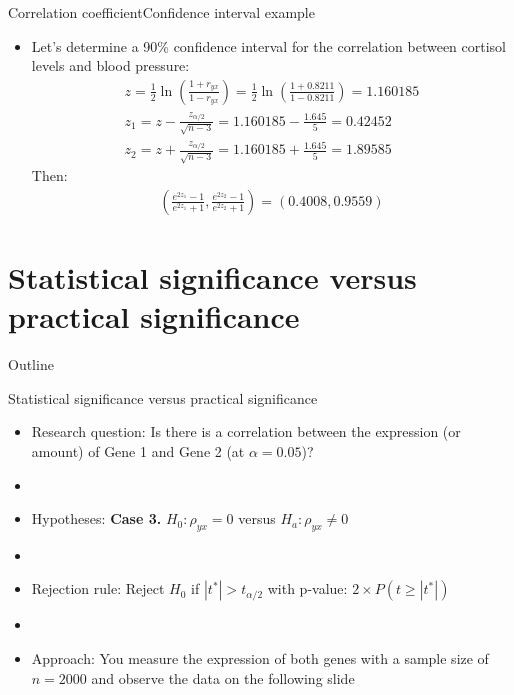 \documentclass[xcolor=dvipsnames]{beamer}
\begin{document}
\begin{frame}{Correlation coefficient}{Confidence interval example}
	\begin{itemize}
		\item Let's determine a 90\% confidence interval for the correlation between cortisol levels and blood pressure:
		\begin{gather*}
		z = \frac{1}{2} \ln \left( \frac{1+r_{yx}}{1-r_{yx}} \right) =  \frac{1}{2} \ln \left( \frac{1+0.8211}{1-0.8211} \right) = 1.160185\\
		z_1 = z - \frac{z_{\alpha / 2}}{\sqrt{n-3}} = 1.160185 - \frac{1.645}{5} = 0.42452 \\
		z_2 = z + \frac{z_{\alpha / 2}}{\sqrt{n-3}} = 1.160185 + \frac{1.645}{5} = 1.89585
		\end{gather*}
		Then: 
		\begin{gather*}
		\left(\frac{e^{2 z_1}-1}{e^{2 z_1}+1}, \frac{e^{2 z_2}-1}{e^{2 z_2}+1} \right) = (0.4008, 0.9559)
		\end{gather*}

	\end{itemize}
\end{frame}

\section{Statistical significance versus practical significance}
\begin{frame}{Outline}
	\tableofcontents[currentsection,subsectionstyle=show/shaded/hide]
\end{frame}

\begin{frame}{Statistical significance versus practical significance}
	\begin{itemize}
		\item Research question: Is there is a correlation between the expression (or amount) of Gene 1 and Gene 2 (at $\alpha = 0.05$)?
		\item[]
		\item Hypotheses: \textbf{Case 3.} $H_0: \rho_{yx} = 0$ versus $H_a: \rho_{yx} \neq 0$
		\item[]
		\item Rejection rule: Reject $H_0$ if $|t^*| > t_{\alpha / 2}$ with p-value: $2\times P(t\geq |t^*|)$
		\item[]
		\item Approach: You measure the expression of both genes with a sample size of $n = 2000$ and observe the data on the following slide
	\end{itemize}
\end{frame}
\end{document}
